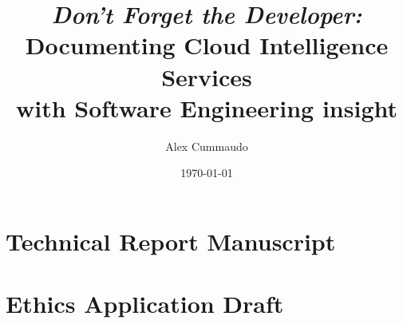 \documentclass[twoside,12pt,titlepage]{book}
\title{\textit{Don't Forget the Developer:}\\
    Documenting Cloud Intelligence Services\\
    with Software Engineering insight
}
\author{Alex Cummaudo}
\date{\today}
\begin{document}
\frontmatter


%
%


\mainmatter




%


\appendix
\chapter{Technical Report Manuscript}
\label{appx:tech-report}
\cleardoublepage


\chapter{Ethics Application Draft}
\label{appx:ethics}
\cleardoublepage
\end{document}
